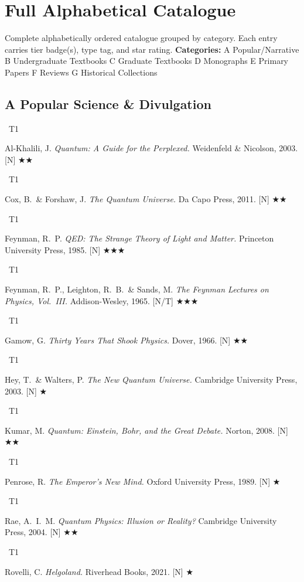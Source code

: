 \documentclass[11pt,a4paper]{article}
\newcommand{\tierbadge}[2]{\colorbox{#1}{\small\bfseries\color{white}\strut\ #2\ }}
\newcommand{\essential}{$\bigstar\bigstar\bigstar$}
\newcommand{\recommended}{$\bigstar\bigstar$}
\newcommand{\useful}{$\bigstar$}
\begin{document}
\section{Full Alphabetical Catalogue}
\label{sec:fullcat}

\begin{tcolorbox}[keybox]
Complete alphabetically ordered catalogue grouped by category.
Each entry carries tier badge(s), type tag, and star rating.
\textbf{Categories:} A Popular/Narrative \quad B Undergraduate Textbooks \quad
C Graduate Textbooks \quad D Monographs \quad E Primary Papers \quad
F Reviews \quad G Historical Collections
\end{tcolorbox}

\subsection*{A \quad Popular Science \& Divulgation}
\begin{tcolorbox}[catbox]
\begin{enumerate}[leftmargin=2.5em,label=\textbf{[A\arabic*]},itemsep=3pt]
  \item \tierbadge{t1green}{T1} Al-Khalili, J. \textit{Quantum: A Guide for the Perplexed.} Weidenfeld \& Nicolson, 2003. [N] \recommended
  \item \tierbadge{t1green}{T1} Cox, B.\ \& Forshaw, J. \textit{The Quantum Universe.} Da Capo Press, 2011. [N] \recommended
  \item \tierbadge{t1green}{T1} Feynman, R.~P. \textit{QED: The Strange Theory of Light and Matter.} Princeton University Press, 1985. [N] \essential
  \item \tierbadge{t1green}{T1} Feynman, R.~P., Leighton, R.~B.\ \& Sands, M. \textit{The Feynman Lectures on Physics, Vol.~III.} Addison-Wesley, 1965. [N/T] \essential
  \item \tierbadge{t1green}{T1} Gamow, G. \textit{Thirty Years That Shook Physics.} Dover, 1966. [N] \recommended
  \item \tierbadge{t1green}{T1} Hey, T.\ \& Walters, P. \textit{The New Quantum Universe.} Cambridge University Press, 2003. [N] \useful
  \item \tierbadge{t1green}{T1} Kumar, M. \textit{Quantum: Einstein, Bohr, and the Great Debate.} Norton, 2008. [N] \recommended
  \item \tierbadge{t1green}{T1} Penrose, R. \textit{The Emperor's New Mind.} Oxford University Press, 1989. [N] \useful
  \item \tierbadge{t1green}{T1} Rae, A.~I.~M. \textit{Quantum Physics: Illusion or Reality?} Cambridge University Press, 2004. [N] \recommended
  \item \tierbadge{t1green}{T1} Rovelli, C. \textit{Helgoland.} Riverhead Books, 2021. [N] \useful
\end{enumerate}
\end{tcolorbox}
\end{document}

